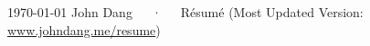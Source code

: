 \documentclass[11pt, letterpaper]{awesome-cv}
\begin{document}
\makecvheader[C]

\makecvfooter
  {\today}
  {John Dang~~~·~~~Résumé (Most Updated Version: \href{https://www.johndang.me/resume}{www.johndang.me/resume})}
  {\thepage}


%
%



% 



% 
% 
% 


\end{document}
